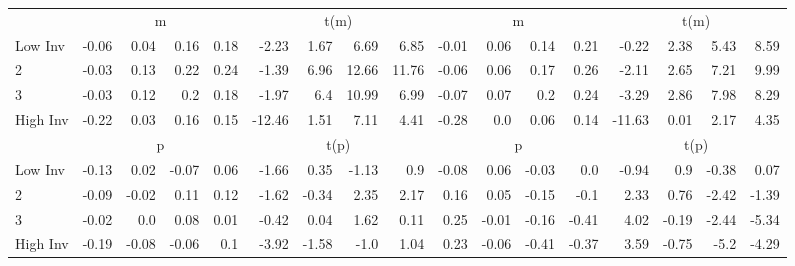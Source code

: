 \begin{table}[!ht]
\begin{tabular}{lrrrrrrrrrrrrrrrr}
  
    
      & \multicolumn{4}{c}{m} & \multicolumn{4}{c}{t(m)}
    
      & \multicolumn{4}{c}{m} & \multicolumn{4}{c}{t(m)}
    
    \\
      \cmidrule(r){2-5} \cmidrule(r){6-9} \cmidrule(r){10-13} \cmidrule(r){14-17}

    Low Inv   & -0.06  & 0.04  & 0.16  & 0.18  & -2.23  & 1.67  & 6.69  & 6.85  & -0.01  & 0.06  & 0.14  & 0.21  & -0.22  & 2.38  & 5.43  & 8.59  \\
           2  & -0.03  & 0.13  & 0.22  & 0.24  & -1.39  & 6.96  & 12.66  & 11.76  & -0.06  & 0.06  & 0.17  & 0.26  & -2.11  & 2.65  & 7.21  & 9.99  \\
           3  & -0.03  & 0.12  & 0.2  & 0.18  & -1.97  & 6.4  & 10.99  & 6.99  & -0.07  & 0.07  & 0.2  & 0.24  & -3.29  & 2.86  & 7.98  & 8.29  \\
    High Inv  & -0.22  & 0.03  & 0.16  & 0.15  & -12.46  & 1.51  & 7.11  & 4.41  & -0.28  & 0.0  & 0.06  & 0.14  & -11.63  & 0.01  & 2.17  & 4.35  \\

  
    
      & \multicolumn{4}{c}{p} & \multicolumn{4}{c}{t(p)}
    
      & \multicolumn{4}{c}{p} & \multicolumn{4}{c}{t(p)}
    
    \\
      \cmidrule(r){2-5} \cmidrule(r){6-9} \cmidrule(r){10-13} \cmidrule(r){14-17}

    Low Inv   & -0.13  & 0.02  & -0.07  & 0.06  & -1.66  & 0.35  & -1.13  & 0.9  & -0.08  & 0.06  & -0.03  & 0.0  & -0.94  & 0.9  & -0.38  & 0.07  \\
           2  & -0.09  & -0.02  & 0.11  & 0.12  & -1.62  & -0.34  & 2.35  & 2.17  & 0.16  & 0.05  & -0.15  & -0.1  & 2.33  & 0.76  & -2.42  & -1.39  \\
           3  & -0.02  & 0.0  & 0.08  & 0.01  & -0.42  & 0.04  & 1.62  & 0.11  & 0.25  & -0.01  & -0.16  & -0.41  & 4.02  & -0.19  & -2.44  & -5.34  \\
    High Inv  & -0.19  & -0.08  & -0.06  & 0.1  & -3.92  & -1.58  & -1.0  & 1.04  & 0.23  & -0.06  & -0.41  & -0.37  & 3.59  & -0.75  & -5.2  & -4.29  \\

  

  \bottomrule
\end{tabular}
\label{tbl:32_Size_OP_Inv_BS2015}
\end{table}